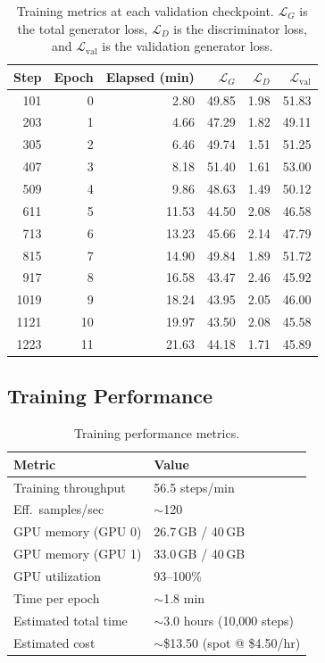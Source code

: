 \documentclass[10pt,a4paper,twocolumn]{article}
\begin{document}
\begin{table}[ht]
\centering
\small
\begin{tabular}{@{}rrrrrr@{}}
\toprule
\textbf{Step} & \textbf{Epoch} & \textbf{Elapsed (min)} & \textbf{$\mathcal{L}_G$} & \textbf{$\mathcal{L}_D$} & \textbf{$\mathcal{L}_{\text{val}}$} \\
\midrule
101  & 0  & 2.80  & 49.85 & 1.98 & 51.83 \\
203  & 1  & 4.66  & 47.29 & 1.82 & 49.11 \\
305  & 2  & 6.46  & 49.74 & 1.51 & 51.25 \\
407  & 3  & 8.18  & 51.40 & 1.61 & 53.00 \\
509  & 4  & 9.86  & 48.63 & 1.49 & 50.12 \\
611  & 5  & 11.53 & 44.50 & 2.08 & 46.58 \\
713  & 6  & 13.23 & 45.66 & 2.14 & 47.79 \\
815  & 7  & 14.90 & 49.84 & 1.89 & 51.72 \\
917  & 8  & 16.58 & 43.47 & 2.46 & 45.92 \\
1019 & 9  & 18.24 & 43.95 & 2.05 & 46.00 \\
1121 & 10 & 19.97 & 43.50 & 2.08 & 45.58 \\
1223 & 11 & 21.63 & 44.18 & 1.71 & 45.89 \\
\bottomrule
\end{tabular}
\caption{Training metrics at each validation checkpoint. $\mathcal{L}_G$ is the total generator loss, $\mathcal{L}_D$ is the discriminator loss, and $\mathcal{L}_{\text{val}}$ is the validation generator loss.}
\label{tab:training_log}
\end{table}

\subsection{Training Performance}

\begin{table}[ht]
\centering
\begin{tabular}{@{}ll@{}}
\toprule
Metric & Value \\
\midrule
Training throughput & 56.5 steps/min \\
Eff.\ samples/sec & $\sim$120 \\
GPU memory (GPU 0) & 26.7\,GB / 40\,GB \\
GPU memory (GPU 1) & 33.0\,GB / 40\,GB \\
GPU utilization & 93--100\% \\
Time per epoch & $\sim$1.8 min \\
Estimated total time & $\sim$3.0 hours (10,000 steps) \\
Estimated cost & $\sim$\$13.50 (spot @ \$4.50/hr) \\
\bottomrule
\end{tabular}
\caption{Training performance metrics.}
\label{tab:performance}
\end{table}
\end{document}
